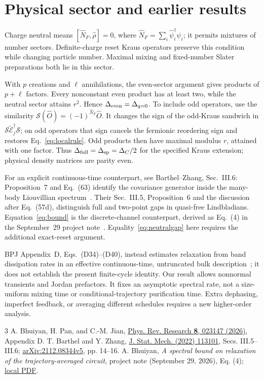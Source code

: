 \documentclass[aps,prb,twocolumn,10pt,raggedbottom,nofootinbib,superscriptaddress]{revtex4-2}
\newcommand{\E}{\widetilde{\mathcal E}}
\begin{document}
\section{Physical sector and earlier results}
Charge neutral means $[\hat N_F,\hat\rho]=0$, where
$\hat N_F=\sum_i\hat\psi_i^\dagger\hat\psi_i$; it permits mixtures
of number sectors. Definite-charge reset Kraus operators preserve this
condition while changing particle number. Maximal mixing and
fixed-number Slater preparations both lie in this sector.

With $p$ creations and $\ell$ annihilations, the even-sector argument
gives products of $p+\ell$ factors. Every nonconstant even product
has at least two, while the neutral sector attains $r^2$. Hence
$\Delta_{\rm even}=\Delta_{q=0}$. To include odd operators, use the
similarity $\mathcal S(\hat O)=(-1)^{\hat N_F}\hat O$. It changes the
sign of the odd-Kraus sandwich in
$\mathcal S\E_j^\dagger\mathcal S$; on odd operators that sign cancels
the fermionic reordering sign and restores Eq.~\eqref{eq:localrule}.
Odd products then have maximal modulus $r$, attained with one factor.
Thus $\Delta_{\rm full}=\Delta_{\rm sp}=\Delta_C/2$ for the specified
Kraus extension; physical density matrices are parity even.

For an explicit continuous-time counterpart, see Barthel--Zhang,
Sec.~III.6: Proposition~7 and Eq.~(63) identify the covariance generator
inside the many-body Liouvillian spectrum~\cite{BZ}. Their Sec.~III.5,
Proposition~6 and the discussion after Eq.~(57d), distinguish full and
two-point gaps in quasi-free Lindbladians. Equation~\eqref{eq:bound}
is the discrete-channel counterpart, derived as Eq.~(4) in the
September~29 project note~\cite{project}. Equality~\eqref{eq:neutralgap}
here requires the additional exact-reset argument.

BPJ Appendix~D, Eqs.~(D34)--(D40), instead estimates relaxation from
band dissipation rates in an effective continuous-time, untruncated
bulk description~\cite{BPJ}; it does not establish the present
finite-cycle identity. Our result allows nonnormal transients and
Jordan prefactors. It fixes an asymptotic spectral rate, not a
size-uniform mixing time or conditional-trajectory purification time.
Extra dephasing, imperfect feedback, or averaging different schedules
requires a new higher-order analysis.

\begin{thebibliography}{3}
A. Bhuiyan, H. Pan, and C.-M. Jian,
\href{https://doi.org/10.1103/nk38-ygyq}{Phys. Rev. Research \textbf{8}, 023147 (2026)},
Appendix D.
T. Barthel and Y. Zhang,
\href{https://doi.org/10.1088/1742-5468/ac8e5c}{J. Stat. Mech. (2022) 113101},
Secs. III.5--III.6;
\href{https://arxiv.org/pdf/2112.08344}{arXiv:2112.08344v5}, pp. 14--16.
A. Bhuiyan, \textit{A spectral bound on relaxation of the
trajectory-averaged circuit}, project note (September 29, 2026), Eq. (4);
\href{../../../matched_markov_lindblad_campaign/spectral_gap_v1/results/20260929T191448Z/analysis/gap_note.pdf}{local PDF}.
\end{thebibliography}
\end{document}
